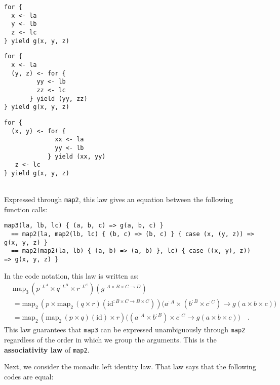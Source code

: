 \noindent %
\begin{minipage}[c][1\totalheight][t]{0.3\columnwidth}%
\begin{lstlisting}
for {
  x <- la
  y <- lb
  z <- lc
} yield g(x, y, z)
\end{lstlisting}
%
\end{minipage}\hfill{}%
\begin{minipage}[c][1\totalheight][t]{0.3\columnwidth}%
\begin{lstlisting}
for {
  x <- la
  (y, z) <- for {
         yy <- lb
         zz <- lc
       } yield (yy, zz)
} yield g(x, y, z)
\end{lstlisting}
%
\end{minipage}\hfill{}%
\begin{minipage}[c][1\totalheight][t]{0.3\columnwidth}%
\begin{lstlisting}
for {
  (x, y) <- for {
              xx <- la
              yy <- lb
            } yield (xx, yy)
   z <- lc
} yield g(x, y, z)
\end{lstlisting}
%
\end{minipage}\\
Expressed through \lstinline!map2!, this law gives an equation between
the following function calls:
\begin{lstlisting}
map3(la, lb, lc) { (a, b, c) => g(a, b, c) }
  == map2(la, map2(lb, lc) { (b, c) => (b, c) } { case (x, (y, z)) => g(x, y, z) }
  == map2(map2(la, lb) { (a, b) => (a, b) }, lc) { case ((x, y), z)) => g(x, y, z) } 
\end{lstlisting}
In the code notation, this law is written as:
\begin{align*}
 & \text{map}_{3}\,(p^{:L^{A}}\times q^{:L^{B}}\times r^{:L^{C}})(g^{:A\times B\times C\rightarrow D})\\
 & =\text{map}_{2}\,(p\times\text{map}_{2}\,(q\times r)(\text{id}^{:B\times C\rightarrow B\times C}))\big(a^{:A}\times(b^{:B}\times c^{:C})\rightarrow g(a\times b\times c)\big)\\
 & =\text{map}_{2}\,(\text{map}_{2}\,(p\times q)(\text{id})\times r)\big((a^{:A}\times b^{:B})\times c^{:C}\rightarrow g(a\times b\times c)\big)\quad.
\end{align*}
This law guarantees that \lstinline!map3! can be expressed unambiguously
through \lstinline!map2! regardless of the order in which we group
the arguments. This is the \textbf{associativity
law} of \lstinline!map2!.

Next, we consider the monadic left identity law. That law says that
the following codes are equal:

